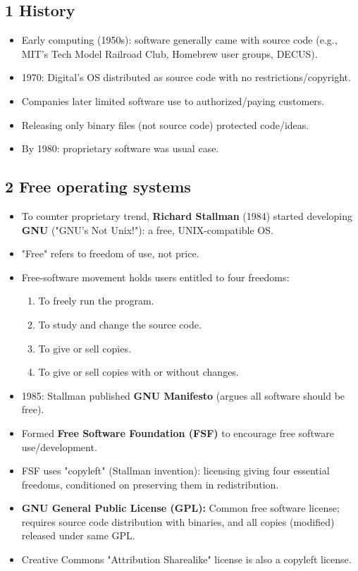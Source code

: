 \documentclass{article}
\begin{document}
\subsection*{1 History}
\begin{itemize}
    \item Early computing (1950s): software generally came with source code (e.g., MIT's Tech Model Railroad Club, Homebrew user groups, DECUS).
    \item 1970: Digital's OS distributed as source code with no restrictions/copyright.
    \item Companies later limited software use to authorized/paying customers.
    \item Releasing only binary files (not source code) protected code/ideas.
    \item By 1980: proprietary software was usual case.
\end{itemize}

\subsection*{2 Free operating systems}
\begin{itemize}
    \item To counter proprietary trend, \textbf{Richard Stallman} (1984) started developing \textbf{GNU} ("GNU's Not Unix!"): a free, UNIX-compatible OS.
    \item "Free" refers to freedom of use, not price.
    \item Free-software movement holds users entitled to four freedoms:
    \begin{enumerate}
        \item To freely run the program.
        \item To study and change the source code.
        \item To give or sell copies.
        \item To give or sell copies with or without changes.
    \end{enumerate}
    \item 1985: Stallman published \textbf{GNU Manifesto} (argues all software should be free).
    \item Formed \textbf{Free Software Foundation (FSF)} to encourage free software use/development.
    \item FSF uses "copyleft" (Stallman invention): licensing giving four essential freedoms, conditioned on preserving them in redistribution.
    \item \textbf{GNU General Public License (GPL):} Common free software license; requires source code distribution with binaries, and all copies (modified) released under same GPL.
    \item Creative Commons "Attribution Sharealike" license is also a copyleft license.
\end{itemize}
\end{document}

